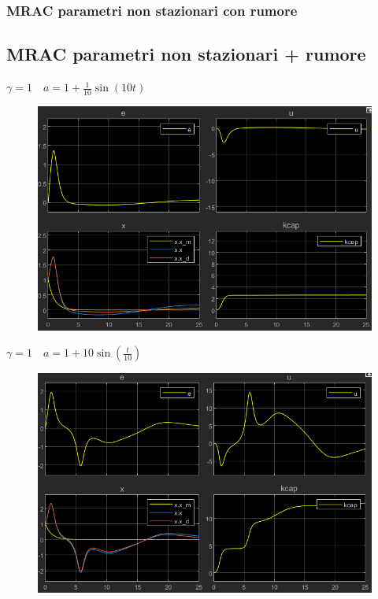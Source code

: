\documentclass{beamer}
\begin{document}
\begin{frame}
	\frametitle{MRAC parametri non stazionari con rumore}
	\subsection{MRAC parametri non stazionari + rumore}
	\begin{minipage}[t]{0.45\textwidth}
		\textbf{\(\gamma=1\quad a=1+\frac{1}{10}\sin{(10t)}\)}
		\begin{figure}
			\includegraphics[scale=0.25]{2022-05-20-12-57-45.png} %
		\end{figure}
	\end{minipage}
	\begin{minipage}[t]{0.45\textwidth}
		\textbf{\(\gamma=1\quad a=1+10\sin{(\frac{t}{10})}\)}
		\begin{figure}
			\includegraphics[scale=0.25]{2022-05-20-12-59-29.png} %
		\end{figure}
	\end{minipage}
\end{frame}
\end{document}
